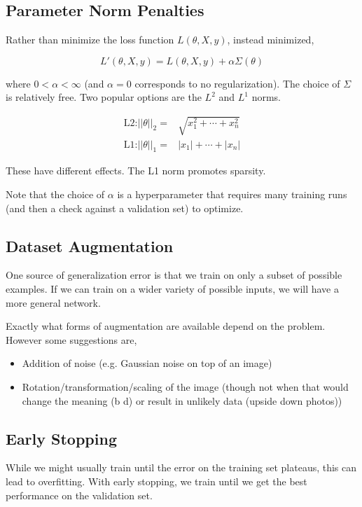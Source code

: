 \documentclass{article}
\begin{document}
\subsection{Parameter Norm Penalties}

Rather than minimize the loss function $L(\theta, X, y)$, instead minimized,

$$
L'(\theta, X, y) = L(\theta, X, y) + \alpha \Sigma(\theta)
$$

\noindent
where $0 < \alpha < \infty$ (and $\alpha = 0$ corresponds to no regularization).
The choice of $\Sigma$ is relatively free.
Two popular options are the $L^2$ and $L^1$ norms.

\begin{align}
    \text{L2:} || \theta ||_2 =& \sqrt{x_1^2 + \cdots + x_n^2} \\
    \text{L1:} || \theta ||_1 =& | x_1 | + \cdots + | x_n |
\end{align}

These have different effects. The L1 norm promotes sparsity.

Note that the choice of $\alpha$ is a hyperparameter that requires many training runs (and then a check against a validation set) to optimize.

\subsection{Dataset Augmentation}

One source of generalization error is that we train on only a subset of possible examples. If we can train on a wider variety of possible inputs, we will have a more general network.

Exactly what forms of augmentation are available depend on the problem. However some suggestions are,

\begin{itemize}
    \item Addition of noise (e.g. Gaussian noise on top of an image)
    \item Rotation/transformation/scaling of the image (though not when that would change the meaning (b d) or result in unlikely data (upside down photos))
\end{itemize}


\subsection{Early Stopping}

While we might usually train until the error on the training set plateaus, this can lead to overfitting. With early stopping, we train until we get the best performance on the validation set.
\end{document}
